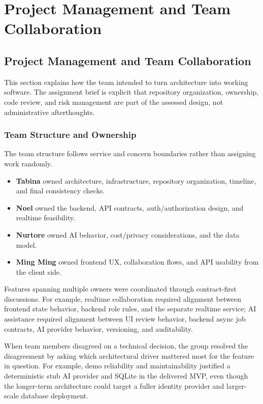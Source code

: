 \part{Project Management and Team Collaboration}

\chapter{Project Management and Team Collaboration}

This section explains how the team intended to turn architecture into working software. The assignment
brief is explicit that repository organization, ownership, code review, and risk management are part of
the assessed design, not administrative afterthoughts.

\section{Team Structure and Ownership}

The team structure follows service and concern boundaries rather than assigning work randomly.

\begin{itemize}
  \item \textbf{Tabina} owned architecture, infrastructure, repository organization, timeline, and final
  consistency checks.
  \item \textbf{Noel} owned the backend, API contracts, auth/authorization design, and realtime feasibility.
  \item \textbf{Nurtore} owned AI behavior, cost/privacy considerations, and the data model.
  \item \textbf{Ming Ming} owned frontend UX, collaboration flows, and API usability from the client side.
\end{itemize}

Features spanning multiple owners were coordinated through contract-first discussions. For example,
realtime collaboration required alignment between frontend state behavior, backend role rules, and the
separate realtime service; AI assistance required alignment between UI review behavior, backend async job
contracts, AI provider behavior, versioning, and auditability.

When team members disagreed on a technical decision, the group resolved the disagreement by asking which
architectural driver mattered most for the feature in question. For example, demo reliability and
maintainability justified a deterministic stub AI provider and SQLite in the delivered MVP, even though
the longer-term architecture could target a fuller identity provider and larger-scale database deployment.

